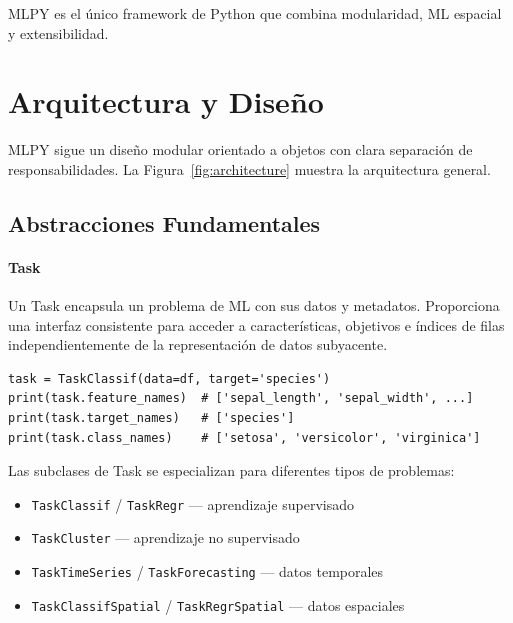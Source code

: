 \documentclass[twoside,11pt]{article}
\begin{document}
MLPY es el único framework de Python que combina modularidad, ML espacial y extensibilidad.

\section{Arquitectura y Diseño}
\label{sec:architecture}

MLPY sigue un diseño modular orientado a objetos con clara separación de responsabilidades. La Figura~\ref{fig:architecture} muestra la arquitectura general.


\subsection{Abstracciones Fundamentales}

\paragraph{Task}
Un Task encapsula un problema de ML con sus datos y metadatos. Proporciona una interfaz consistente para acceder a características, objetivos e índices de filas independientemente de la representación de datos subyacente.

\begin{lstlisting}
task = TaskClassif(data=df, target='species')
print(task.feature_names)  # ['sepal_length', 'sepal_width', ...]
print(task.target_names)   # ['species']
print(task.class_names)    # ['setosa', 'versicolor', 'virginica']
\end{lstlisting}

Las subclases de Task se especializan para diferentes tipos de problemas:
\begin{itemize}
  \item \texttt{TaskClassif} / \texttt{TaskRegr} --- aprendizaje supervisado
  \item \texttt{TaskCluster} --- aprendizaje no supervisado
  \item \texttt{TaskTimeSeries} / \texttt{TaskForecasting} --- datos temporales
  \item \texttt{TaskClassifSpatial} / \texttt{TaskRegrSpatial} --- datos espaciales
\end{itemize}
\end{document}
